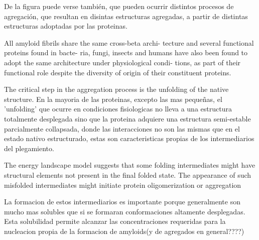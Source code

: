 De la figura puede verse también, que pueden ocurrir distintos procesos de agregación, que resultan en disintas estructuras agregadas, a partir de distintas estructuras adoptadas por las proteinas.



All amyloid fibrils share the same cross-beta archi-
tecture and several functional proteins found in bacte-
ria, fungi, insects and humans have also been found to
adopt the same architecture under physiological condi-
tions, as part of their functional role despite the diversity of origin of their
constituent proteins.













The critical step in the aggregation process is the unfolding of the native structure. 
En la mayoria de las proteinas, excepto las mas pequeñas, el 'unfolding' que ocurre en condiciones fisiologicas no lleva a una estructura totalmente desplegada sino que la proteina adquiere una estructura semi-estable parcialmente collapsada,
donde las interacciones no son las mismas que en el estado nativo estructurado, estas son caracteristicas propias de los intermediarios del plegamiento.

The energy landscape model suggests that some folding intermediates might have structural elements not present in the final folded state.
The appearance of such misfolded intermediates might initiate protein oligomerization or aggregation

La formacion de estos intermediarios es importante porque generalmente son mucho mas solubles que si se formaran conformaciones altamente desplegadas. 
Esta solubilidad permite alcanzar las concentraciones requeridas para la nucleacion propia de la formacion de amyloids(y de agregados en general????)















